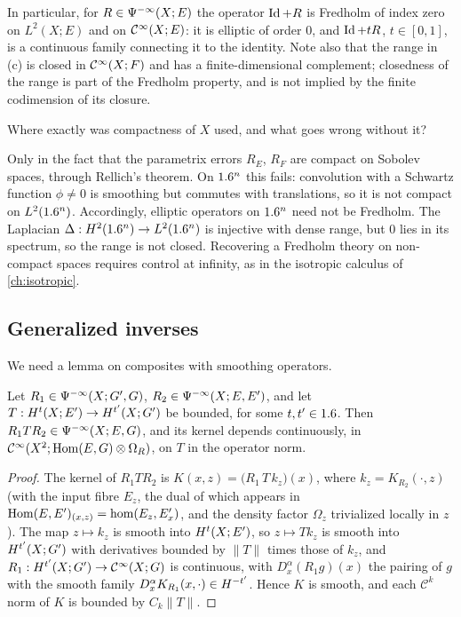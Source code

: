 In particular, for $R\in\Psi^{-\infty}(X;E)$ the operator $\operatorname{Id}+R$ is Fredholm of
index zero on $L^2(X;E)$ and on $\mathcal{C}^\infty(X;E)$: it is elliptic of order $0$, and
$\operatorname{Id}+tR$, $t\in[0,1]$, is a continuous family connecting it to the identity. Note
also that the range in (c) is closed in $\mathcal{C}^\infty(X;F)$ and has a finite-dimensional
complement; closedness of the range is part of the Fredholm property, and is not
implied by the finite codimension of its closure.

\begin{question}
Where exactly was compactness of $X$ used, and what goes wrong without it?
\end{question}
\begin{answer}
Only in the fact that the parametrix errors $R_E$, $R_F$ are compact on
Sobolev spaces, through Rellich's theorem. On $1.6^n$ this fails: convolution
with a Schwartz function $\phi\ne0$ is smoothing but commutes with
translations, so it is not compact on $L^2(1.6^n)$. Accordingly, elliptic
operators on $1.6^n$ need not be Fredholm. The Laplacian
$\Delta:H^{2}(1.6^n)\to L^2(1.6^n)$ is injective with dense range, but $0$ lies in
its spectrum, so the range is not closed. Recovering a Fredholm theory on
non-compact spaces requires control at infinity, as in the isotropic calculus
of \cref{ch:isotropic}.
\end{answer}

\subsection{Generalized inverses}
We need a lemma on composites with smoothing operators.

\begin{lemma}\label{manifolds:lem:sandwich}
Let $R_1\in\Psi^{-\infty}(X;G',G)$, $R_2\in\Psi^{-\infty}(X;E,E')$, and let
$T:H^{t}(X;E')\to H^{t'}(X;G')$ be bounded, for some $t,t'\in1.6$. Then
$R_1TR_2\in\Psi^{-\infty}(X;E,G)$, and its kernel depends continuously, in
$\mathcal{C}^\infty(X^2;\operatorname{Hom}(E,G)\otimes\Omega_R)$, on $T$ in the operator norm.
\end{lemma}
\begin{proof}
The kernel of $R_1TR_2$ is $K(x,z)=\big(R_1\,T\,k_z\big)(x)$, where $k_z=K_{R_2}(\cdot,z)$
(with the input fibre $E_z$, the dual of which appears in
$\operatorname{Hom}(E,E')_{(x,z)}=\hom(E_z,E'_x)$, and the density factor $\Omega_z$ trivialized locally in $z$). The map $z\mapsto k_z$
is smooth into $H^{t}(X;E')$, so $z\mapsto Tk_z$ is smooth into $H^{t'}(X;G')$ with
derivatives bounded by $\|T\|$ times those of $k_z$, and
$R_1:H^{t'}(X;G')\to\mathcal{C}^\infty(X;G)$ is continuous, with $D^\alpha_x(R_1g)(x)$ the pairing of $g$
with the smooth family $D^\alpha_xK_{R_1}(x,\cdot)\in H^{-t'}$. Hence $K$ is smooth, and each
$\mathcal C^k$ norm of $K$ is bounded by $C_k\|T\|$.
\end{proof}

